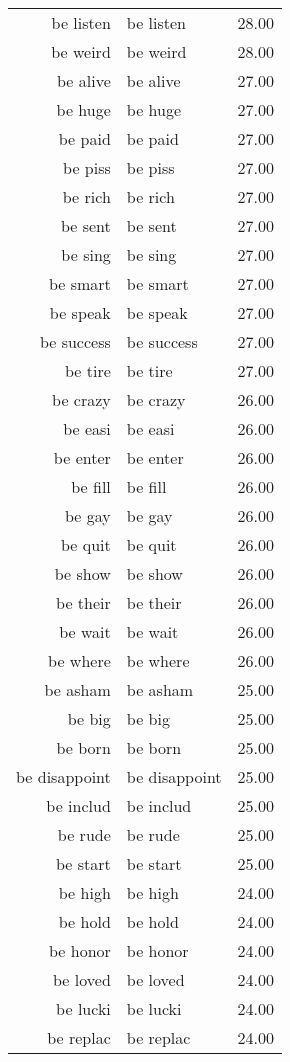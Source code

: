 \begin{table}[ht]
\begin{tabular}{rlr}
  be listen & be listen & 28.00 \\ 
  be weird & be weird & 28.00 \\ 
  be alive & be alive & 27.00 \\ 
  be huge & be huge & 27.00 \\ 
  be paid & be paid & 27.00 \\ 
  be piss & be piss & 27.00 \\ 
  be rich & be rich & 27.00 \\ 
  be sent & be sent & 27.00 \\ 
  be sing & be sing & 27.00 \\ 
  be smart & be smart & 27.00 \\ 
  be speak & be speak & 27.00 \\ 
  be success & be success & 27.00 \\ 
  be tire & be tire & 27.00 \\ 
  be crazy & be crazy & 26.00 \\ 
  be easi & be easi & 26.00 \\ 
  be enter & be enter & 26.00 \\ 
  be fill & be fill & 26.00 \\ 
  be gay & be gay & 26.00 \\ 
  be quit & be quit & 26.00 \\ 
  be show & be show & 26.00 \\ 
  be their & be their & 26.00 \\ 
  be wait & be wait & 26.00 \\ 
  be where & be where & 26.00 \\ 
  be asham & be asham & 25.00 \\ 
  be big & be big & 25.00 \\ 
  be born & be born & 25.00 \\ 
  be disappoint & be disappoint & 25.00 \\ 
  be includ & be includ & 25.00 \\ 
  be rude & be rude & 25.00 \\ 
  be start & be start & 25.00 \\ 
  be high & be high & 24.00 \\ 
  be hold & be hold & 24.00 \\ 
  be honor & be honor & 24.00 \\ 
  be loved & be loved & 24.00 \\ 
  be lucki & be lucki & 24.00 \\ 
  be replac & be replac & 24.00 \\ 

\end{tabular}
\end{table}

